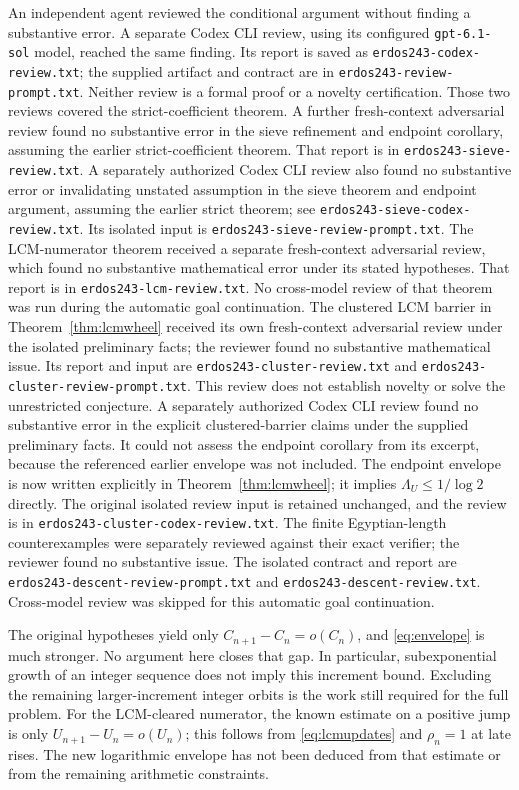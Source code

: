 \documentclass[11pt]{article}
\begin{document}
An independent agent reviewed the conditional argument without finding a
substantive error. A separate Codex CLI review, using its configured
\texttt{gpt-6.1-sol} model, reached the same finding. Its report is saved as
\texttt{erdos243-codex-review.txt}; the supplied artifact and contract are
in \texttt{erdos243-review-prompt.txt}. Neither review is a formal proof
or a novelty certification. Those two reviews covered the strict-coefficient
theorem. A further fresh-context adversarial review found no substantive
error in the sieve refinement and endpoint corollary, assuming the earlier
strict-coefficient theorem. That report is in
\texttt{erdos243-sieve-review.txt}. A separately authorized Codex CLI
review also found no substantive error or invalidating unstated assumption
in the sieve theorem and endpoint argument, assuming the earlier strict
theorem; see \texttt{erdos243-sieve-codex-review.txt}. Its isolated input is
\texttt{erdos243-sieve-review-prompt.txt}.
The LCM-numerator theorem received a separate fresh-context adversarial
review, which found no substantive mathematical error under its stated
hypotheses. That report is in \texttt{erdos243-lcm-review.txt}.
No cross-model review of that theorem was run during the automatic goal
continuation.
The clustered LCM barrier in Theorem~\ref{thm:lcmwheel} received its own
fresh-context adversarial review under the isolated preliminary facts;
the reviewer found no substantive mathematical issue. Its report and
input are \texttt{erdos243-cluster-review.txt} and
\texttt{erdos243-cluster-review-prompt.txt}. This review does not
establish novelty or solve the unrestricted conjecture.
A separately authorized Codex CLI review found no substantive error
in the explicit clustered-barrier claims under the supplied preliminary
facts. It could not assess the endpoint corollary from its excerpt,
because the referenced earlier envelope was not included. The endpoint
envelope is now written explicitly in Theorem~\ref{thm:lcmwheel};
it implies $\Lambda_U\le1/\log2$ directly. The original isolated
review input is retained unchanged, and the review is in
\texttt{erdos243-cluster-codex-review.txt}.
The finite Egyptian-length counterexamples were separately reviewed
against their exact verifier; the reviewer found no substantive issue.
The isolated contract and report are
\texttt{erdos243-descent-review-prompt.txt} and
\texttt{erdos243-descent-review.txt}. Cross-model review was skipped
for this automatic goal continuation.

The original hypotheses yield only $C_{n+1}-C_n=o(C_n)$, and
\eqref{eq:envelope} is much stronger. No argument here closes that gap.
In particular, subexponential growth of an integer sequence does not
imply this increment bound. Excluding the remaining larger-increment
integer orbits is the work still required for the full problem.
For the LCM-cleared numerator, the known estimate on a positive jump is
only $U_{n+1}-U_n=o(U_n)$; this follows from \eqref{eq:lcmupdates}
and $\rho_n=1$ at late rises. The new logarithmic envelope has not been
deduced from that estimate or from the remaining arithmetic constraints.
\end{document}
